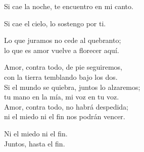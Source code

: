 \begin{lyrics}
Si cae la noche, te encuentro en mi canto.

Si cae el cielo, lo sostengo por ti.

Lo que juramos no cede al quebranto;\\
lo que es amor vuelve a florecer aquí.

Amor, contra todo, de pie seguiremos,\\
con la tierra temblando bajo los dos.\\
Si el mundo se quiebra, juntos lo alzaremos;\\
tu mano en la mía, mi voz en tu voz.\\
Amor, contra todo, no habrá despedida;\\
ni el miedo ni el fin nos podrán vencer.

Ni el miedo ni el fin.\\
Juntos, hasta el fin.
\end{lyrics}

